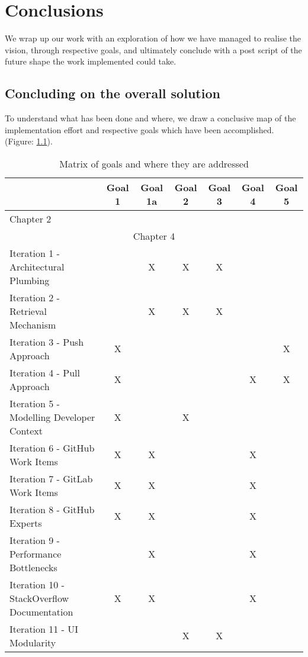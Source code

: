 \chapter{Conclusions}

We wrap up our work with an exploration of how we have managed to realise the vision, through respective goals, and ultimately conclude with a post script of the future shape the work implemented could take.

\section{Concluding on the overall solution}

To understand what has been done and where, we draw a conclusive map of the implementation effort and respective goals which have been accomplished. (Figure: \ref{table:matrixOfGoalsAndTheirImplementationEffort}). 

\begin{table}[h!]
\centering
\small
	\begin{tabular}{|p{6cm}|c|c|c|c|c|c|}
		\hline 
		& Goal 1 & Goal 1a & Goal 2 & Goal 3 & Goal 4 & Goal 5 \\ 
		\hline 
		Chapter 2 &  &  &  &  &  &  \\ 
		\hline 
		\multicolumn{7}{|c|}{Chapter 4} \\ 
		\hline 
		Iteration 1 - Architectural Plumbing &  & X & X & X &  &  \\ 
		\hline 	
		Iteration 2 - Retrieval Mechanism &  & X & X & X &  &  \\ 
		\hline 	
		Iteration 3 - Push Approach & X &  &  &  &  & X \\ 
		\hline 
		Iteration 4 - Pull Approach & X &  &  &  & X & X \\ 
		\hline 
		Iteration 5 - Modelling Developer Context & X &  & X &  & &  \\ 
		\hline 
		Iteration 6 - GitHub Work Items & X & X &  &  & X &  \\ 
		\hline 
		Iteration 7 - GitLab Work Items & X & X &  &  & X &  \\ 
		\hline 
		Iteration 8 - GitHub Experts & X & X &  &  & X &  \\ 
		\hline 
		Iteration 9 - Performance Bottlenecks &  & X &  &  & X &  \\ 
		\hline 
		Iteration 10 - StackOverflow Documentation & X & X &  &  & X &  \\ 
		\hline 
		Iteration 11 - UI Modularity &  &  & X & X &  &  \\ 
		\hline 
	\end{tabular} 
	\caption{Matrix of goals and where they are addressed}
	\label{table:matrixOfGoalsAndTheirImplementationEffort}
\end{table}


